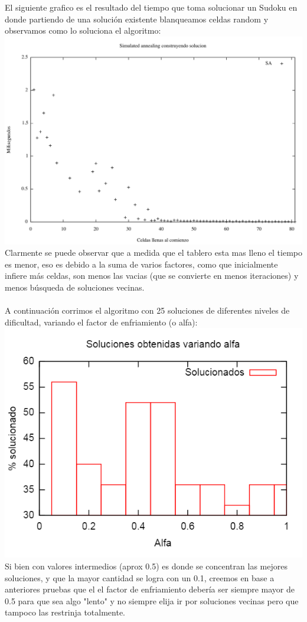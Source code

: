El siguiente grafico es el resultado del tiempo que toma solucionar un Sudoku en donde partiendo de una solución existente blanqueamos celdas random y observamos como lo soluciona el algoritmo:\\
\includegraphics[scale=0.5]{imgs/randomSA.png}	\\
Clarmente se puede observar que a medida que el tablero esta mas lleno el tiempo es menor, eso es debido a la suma de varios factores, como que inicialmente infiere más celdas, son menos las vacias (que se convierte en menos iteraciones) y menos búsqueda de soluciones vecinas.\\\\

A continuación corrimos el algoritmo con 25 soluciones de diferentes niveles de dificultad, variando el factor de enfriamiento (o alfa):\\
\includegraphics[scale=0.7]{imgs/porc_soluc.png}	\\
Si bien con valores intermedios (aprox 0.5) es donde se concentran las mejores soluciones, y que la mayor cantidad se logra con un 0.1, creemos en base a anteriores pruebas que el el factor de enfriamiento debería ser siempre mayor de 0.5 para que sea algo "lento" y no siempre elija ir por soluciones vecinas pero que tampoco las restrinja totalmente. 

